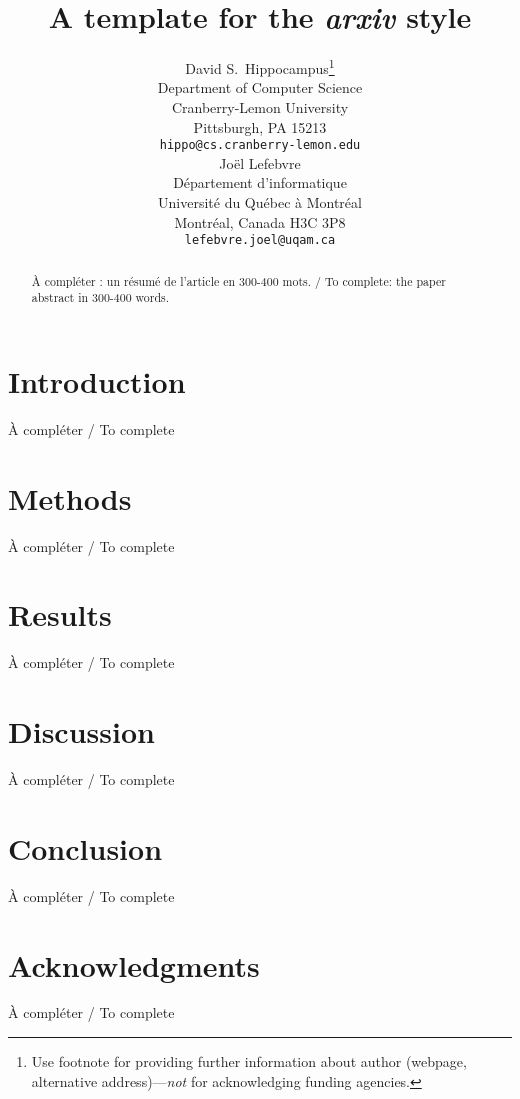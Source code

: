 \documentclass{article}
\title{A template for the \emph{arxiv} style}
\author{
  David S.~Hippocampus\thanks{Use footnote for providing further
    information about author (webpage, alternative
    address)---\emph{not} for acknowledging funding agencies.} \\
  Department of Computer Science\\
  Cranberry-Lemon University\\
  Pittsburgh, PA 15213 \\
  \texttt{hippo@cs.cranberry-lemon.edu} \\
   \And
 Joël Lefebvre \\
  Département d'informatique\\
  Université du Québec à Montréal \\
  Montréal, Canada H3C 3P8\\
  \texttt{lefebvre.joel@uqam.ca} \\
}
\begin{document}
\maketitle

\begin{abstract}
À compléter : un résumé de l'article en 300-400 mots. / To complete: the paper abstract in 300-400 words.
\end{abstract}




\section{Introduction} %
À compléter / To complete

\section{Methods} %
À compléter / To complete

\section{Results} %
À compléter / To complete

\section{Discussion} %
À compléter / To complete

\section{Conclusion} %
À compléter / To complete

\section*{Acknowledgments} %
À compléter / To complete
\end{document}
